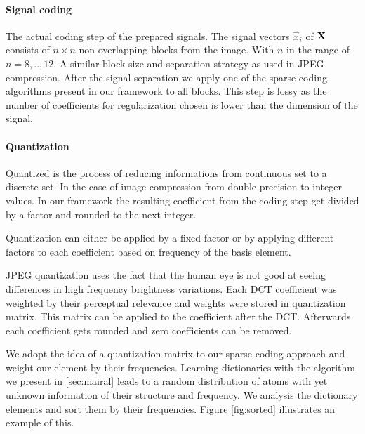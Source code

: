 

\paragraph{Signal coding}
The actual coding step of the prepared signals. The signal vectors $\vec{x}_i$
of $\boldsymbol{\mathrm{X}}$ consists of $n \times n$ non overlapping blocks from the image.
With $n$ in the range of $n=8,..,12$. A similar block size and separation
strategy as used in JPEG compression. After the signal separation we apply one
of the sparse coding algorithms present in our framework to all blocks. This
step is lossy as the number of coefficients for regularization chosen is lower
than the dimension of the signal. 

\paragraph{Quantization}
Quantized is the process of reducing informations from continuous set to a
discrete set. In the case of image compression from double precision to integer
values. In our framework the resulting coefficient from the coding step get
divided by a factor and rounded to the next integer.  

Quantization can either be applied by a fixed factor or by applying different 
factors to each coefficient based on frequency of the basis element.

JPEG quantization uses the fact that the human eye is not good at seeing
differences in high frequency brightness variations. Each DCT coefficient was
weighted by their perceptual relevance and weights were stored in quantization
matrix. This matrix can be applied to the coefficient after the DCT. 
Afterwards each coefficient gets rounded and zero coefficients can be removed.

We adopt the idea of a quantization matrix to our sparse coding approach and
weight our element by their frequencies. Learning dictionaries with the
algorithm we present in \ref{sec:mairal} leads to a random distribution of atoms
with yet unknown information of their structure and frequency. We analysis the
dictionary elements and sort them by their frequencies. Figure 
\ref{fig:sorted} illustrates an example of this.


